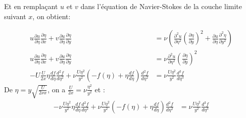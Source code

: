 \documentclass[french]{article}
\begin{document}
Et en remplaçant $u$ et $v$ dans l'équation de Navier-Stokes de la couche limite suivant $x$, on obtient:


\begin{align*}	
	u\frac{\partial u}{\partial \eta}
	\frac{\partial \eta}{\partial x} + 
	v\frac{\partial u}{\partial \eta} 
	\frac{\partial \eta}{\partial y}
	&= \nu\left(
	\frac{\partial^{2} u}{\partial  \eta^{2}}
	\left(
	\frac{\partial \eta}{\partial  y}
	\right)^{2} +
	\frac{\partial u}{\partial  \eta}
	\frac{\partial^{2} \eta}{\partial  y^{2}}
	\right)\\
	u\frac{\partial u}{\partial \eta}
	\frac{\partial \eta}{\partial x} + 
	v\frac{\partial u}{\partial \eta} 
	\frac{\partial \eta}{\partial y}
	&= \nu
	\frac{\partial^{2} u}{\partial  \eta^{2}}
	\left(
	\frac{\partial \eta}{\partial  y}
	\right)^{2} \\
	-U\frac{U}{2x} 
	\eta
	\frac{d f}{d \eta}
	\frac{d^{2} f}{d \eta^{2}}
	+ 
	\nu
	\frac{U\eta^{2}}{y^{2}}
	\left(
	-f(\eta) + \eta\frac{d f}{d \eta}
	\right)
	\frac{d^{2} f}{d \eta^{2}} 
	&= \nu
	\frac{U\eta^{2}}{y^{2}}
	\frac{d^{3} f}{d\eta^{3}}
\end{align*}
De $\eta = y \sqrt{\frac{U}{2\nu x }}$, on a $
	\frac{U}{2x} = \nu 
	\frac{\eta^{2}}{y^{2}}
$ et : 
\begin{align*}	
	-\nu
	\frac{U\eta^{2}}{y^{2}} 
	\eta
	\frac{d f}{d \eta}
	\frac{d^{2} f}{d \eta^{2}}
	+ 
	\nu
	\frac{U\eta^{2}}{y^{2}}
	\left(
	-f(\eta) + \eta\frac{d f}{d \eta}
	\right)
	\frac{d^{2} f}{d \eta^{2}} 
	&= \nu
	\frac{U\eta^{2}}{y^{2}}
	\frac{d^{3} f}{d\eta^{3}}
\end{align*}
\end{document}

